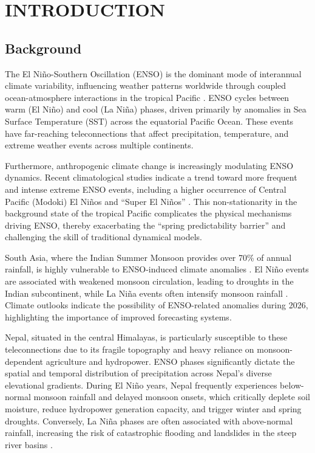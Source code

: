 \chapter{INTRODUCTION}

\section{Background}

The El Ni\~{n}o-Southern Oscillation (ENSO) is the dominant mode of interannual climate variability, influencing weather patterns worldwide through coupled ocean-atmosphere interactions in the tropical Pacific \cite{ham2019deep}. ENSO cycles between warm (El Ni\~{n}o) and cool (La Ni\~{n}a) phases, driven primarily by anomalies in Sea Surface Temperature (SST) across the equatorial Pacific Ocean. These events have far-reaching teleconnections that affect precipitation, temperature, and extreme weather events across multiple continents.

Furthermore, anthropogenic climate change is increasingly modulating ENSO dynamics. Recent climatological studies indicate a trend toward more frequent and intense extreme ENSO events, including a higher occurrence of Central Pacific (Modoki) El Ni\~{n}os and ``Super El Ni\~{n}os'' \cite{cai2015continued}. This non-stationarity in the background state of the tropical Pacific complicates the physical mechanisms driving ENSO, thereby exacerbating the ``spring predictability barrier'' and challenging the skill of traditional dynamical models.

South Asia, where the Indian Summer Monsoon provides over 70\% of annual rainfall, is highly vulnerable to ENSO-induced climate anomalies \cite{ye2024resonet}. El Ni\~{n}o events are associated with weakened monsoon circulation, leading to droughts in the Indian subcontinent, while La Ni\~{n}a events often intensify monsoon rainfall \cite{mahesh2024physics}. Climate outlooks indicate the possibility of ENSO-related anomalies during 2026, highlighting the importance of improved forecasting systems.

Nepal, situated in the central Himalayas, is particularly susceptible to these teleconnections due to its fragile topography and heavy reliance on monsoon-dependent agriculture and hydropower. ENSO phases significantly dictate the spatial and temporal distribution of precipitation across Nepal's diverse elevational gradients. During El Ni\~{n}o years, Nepal frequently experiences below-normal monsoon rainfall and delayed monsoon onsets, which critically deplete soil moisture, reduce hydropower generation capacity, and trigger winter and spring droughts. Conversely, La Ni\~{n}a phases are often associated with above-normal rainfall, increasing the risk of catastrophic flooding and landslides in the steep river basins \cite{shrestha2021enso}.

